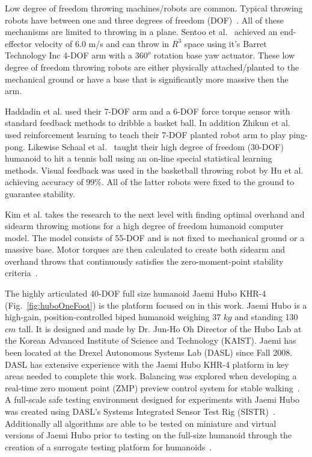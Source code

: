 Low degree of freedom throwing machines/robots are common.  Typical throwing robots have between one and three degrees of freedom (DOF)~\cite{509405, Lynch97dynamicnonprehensile, 5152525, 509335, springerlink:10.1007/s10015-006-0401-0}.  All of these mechanisms are limited to throwing in a plane.   Sentoo et al.~\cite{4651142} achieved an end-effector velocity of 6.0 m/s and can throw in $R^3$ space using it's Barret Technology Inc 4-DOF arm with a $360^o$ rotation base yaw actuator.  These low degree of freedom throwing robots are either physically attached/planted to the mechanical ground or have a base that is significantly more massive then the arm.  

Haddadin et al.\cite{6094757} used their 7-DOF arm and a 6-DOF force torque sensor with standard feedback methods to dribble a basket ball.  In addition Zhikun et al.~\cite{6094892} used reinforcement learning to teach their 7-DOF planted robot arm to play ping-pong.  Likewise Schaal et al.~\cite{schaal01/BIRG} taught their high degree of freedom (30-DOF) humanoid to hit a tennis ball using an on-line special statistical learning methods.  Visual feedback was used in the basketball throwing robot by Hu et al.~\cite{5649335} achieving accuracy of 99\%.  All of the latter robots were fixed to the ground to guarantee stability.

Kim et al. \cite{5686315,JooH2011438} takes the research to the next level with finding optimal overhand and sidearm throwing motions for a high degree of freedom humanoid computer model.  The model consists of 55-DOF and is not fixed to mechanical ground or a massive base.  Motor torques are then calculated to create both sidearm and overhand throws that continuously satisfies the zero-moment-point stability criteria~\cite{4309277}.  

The highly articulated 40-DOF full size humanoid Jaemi Hubo KHR-4 (Fig.~\ref{fig:huboOneFoot}) is the platform focused on in this work.  Jaemi Hubo is a high-gain, position-controlled biped humanoid weighing 37 $kg$ and standing 130 $cm$ tall.  It is designed and made by Dr. Jun-Ho Oh Director of the Hubo Lab at the Korean Advanced Institute of Science and Technology (KAIST).  Jaemi has been located at the Drexel Autonomous Systems Lab (DASL) since Fall 2008.  DASL has extensive experience with the Jaemi Hubo KHR-4 platform in key areas needed to complete this work.  Balancing was explored when developing a real-time zero moment point (ZMP) preview control system for stable walking~\cite{5686276}.  A full-scale safe testing environment designed for experiments with Jaemi Hubo was created using DASL's Systems Integrated Sensor Test Rig (SISTR)~\cite{5686325}.  Additionally all algorithms are able to be tested on miniature and virtual versions of Jaemi Hubo prior to testing on the full-size humanoid through the creation of a surrogate testing platform for humanoids~\cite{5379582}.


